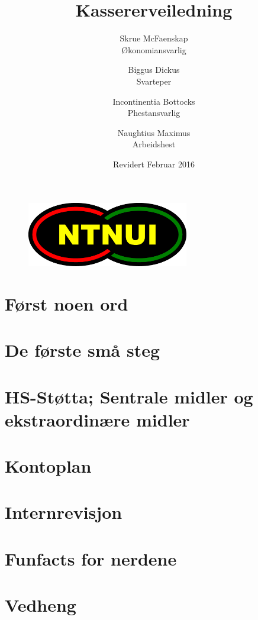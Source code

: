 \documentclass{article}
\title{\huge Kassererveiledning}
\date{Revidert Februar 2016}
\author{Skrue McFaenskap \\ Økonomiansvarlig 
		\and  Biggus Dickus \\ Svarteper
		\and Incontinentia Bottocks \\ Phestansvarlig 
		\and Naughtius Maximus \\ Arbeidshest}
\begin{document}
	\begin{figure}
		\centering
		\includegraphics[keepaspectratio=true, width=200pt]{bildr/logo}
	\end{figure}
\maketitle

\tableofcontents
\newpage


\section*{Først noen ord}
    

\section{De første små steg}
    

\newpage
\section{HS-Støtta; Sentrale midler og ekstraordinære midler}
    
    
\newpage
    

\newpage

\section{Kontoplan}
    

\newpage
\section{Internrevisjon}

\newpage
\section*{Funfacts for nerdene}
%	



\newpage
\section{Vedheng}
	
\end{document}
